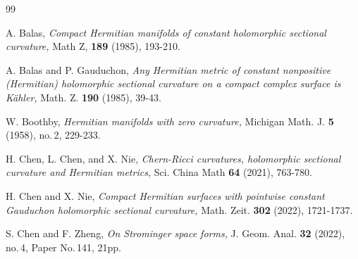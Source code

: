 \documentclass{amsart}
\begin{document}
\begin{thebibliography}{99}




 A. Balas, \emph{Compact Hermitian manifolds of constant holomorphic sectional curvature,} Math Z, {\bf 189} (1985), 193-210.

 A. Balas and P. Gauduchon, \emph{Any Hermitian metric of constant nonpositive (Hermitian) holomorphic sectional curvature on a  compact complex surface is K\"ahler,} Math. Z. {\bf 190} (1985), 39-43.








 W. Boothby, \emph{Hermitian manifolds with zero curvature,} Michigan Math. J. {\bf 5} (1958), no.\,2, 229-233.






 H. Chen, L. Chen, and X. Nie, \emph{Chern-Ricci curvatures, holomorphic sectional curvature and  Hermitian metrics,}  Sci. China Math {\bf 64} (2021), 763-780.


 H. Chen and X. Nie, \emph{Compact Hermitian surfaces with pointwise constant Gauduchon holomorphic sectional curvature,}  Math. Zeit. {\bf 302} (2022), 1721-1737.

 S. Chen and F. Zheng, \emph{On Strominger space forms,}  J. Geom. Anal. {\bf 32} (2022), no.\,4, Paper No.\,141, 21pp.



\end{thebibliography}
\end{document}

